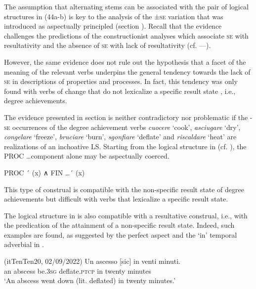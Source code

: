 \documentclass[output=paper,colorlinks,citecolor=brown
]{langscibook}
\begin{document}
The assumption that alternating stems can be associated with the pair of logical structures in (44a-b) is key to the analysis of the ±\textsc{se} variation that was introduced as aspectually principled (section ). Recall that the evidence challenges the predictions of the constructionist analyses which associate \textsc{se} with resultativity and the absence of \textsc{se} with lack of resultativity (cf. —). 

However, the same evidence does not rule out the hypothesis that a facet of the meaning of the relevant verbs underpins the general tendency towards the lack of \textsc{se} in descriptions of properties and processes. In fact, this tendency was only found with verbs of change that do not lexicalize a specific result state \citep{cennamo2012aspectual}, i.e., degree achievements. 

The evidence presented in section  is neither contradictory nor problematic if the -\textsc{se} occurrences of the degree achievement verbs \textit{cuocere} ‘cook’, \textit{asciugare} ‘dry’, \textit{congelare} ‘freeze’, \textit{bruciare} ‘burn’, \textit{sgonfiare} ‘deflate’ and \textit{riscaldare} ‘heat’ are realizations of an inchoative LS. Starting from the logical structure in  (cf. ), the PROC \ldots  component alone may be aspectually coerced. 

\ea \label{bentley_example_48}
    PROC ´ (x) ∧ FIN  \ldots {}´ (x)
\z

This type of construal is compatible with the non-specific result state of degree achievements but difficult with verbs that lexicalize a specific result state. 

The logical structure in  is also compatible with a resultative construal, i.e., with the predication of the attainment of a non-specific result state. Indeed, such examples are found, as suggested by the perfect aspect and the ‘in’ temporal adverbial in .


\hspace*{\fill}(itTenTen20, 02/09/2022)\quad
\ea \label{bentley_example_49}
    \gll Un ascesso	{ [sic]} 						in venti 			minuti. \\
    an	abscess be.3\textsc{sg}		deflate.\textsc{ptcp}		in	twenty		minutes \\
    \glt ‘An abscess went down (lit. deflated) in twenty minutes.’
\z
\end{document}
